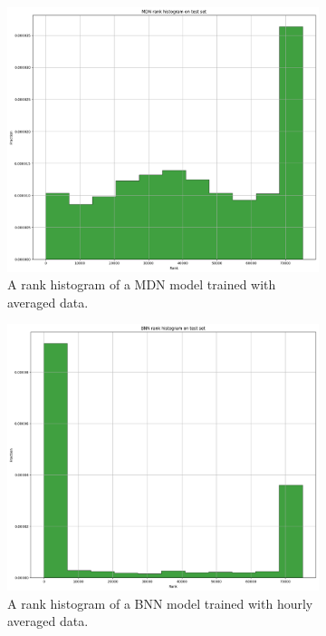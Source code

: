\documentclass[12pt,a4paper,twoside]{scrartcl}
\numberwithin{equation}{section}
\newcounter{mypagecount}%
\newenvironment{interlude}{%
  \clearpage
  \setcounter{mypagecount}{\value{page}}%
  \thispagestyle{empty}%
  \pagestyle{empty}%
}{%
  \clearpage
  \setcounter{page}{\value{mypagecount}}%
}
\begin{document}
\begin{interlude}
\begin{appendices}
\begin{figure}[h!]
      \caption[Rank histograms (twelve hourly averaged data)]{}\label{fig:rank-12h}
    \end{figure}
    \begin{figure}[H]
      \centering
      \begin{subfigure}[t]{0.49\textwidth}
        \includegraphics[width=\textwidth,height=0.7\textwidth]{figures/model_plots/mdn-rank-1h}%
        \caption{A rank histogram of a MDN model trained with averaged data.}
      \end{subfigure}
      \begin{subfigure}[t]{0.49\textwidth}
        \includegraphics[width=\textwidth,height=0.7\textwidth]{figures/model_plots/bnn-rank-1h}%
        \caption{A rank histogram of a BNN model trained with hourly averaged data.}
      \end{subfigure}
      \caption[Rank histograms (hourly averaged data)]{}\label{fig:rank-1h}
    \end{figure}
    \vfill
    \clearpage

\end{appendices}
\end{interlude}
\end{document}
